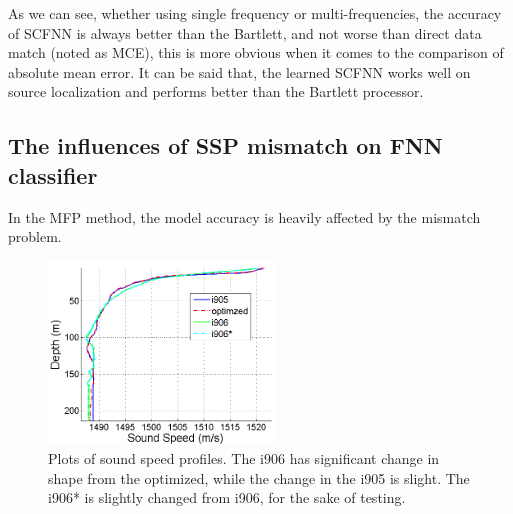 As we can see, whether using single frequency or multi-frequencies, the accuracy of SCFNN is always better than the Bartlett, and not worse than direct data match (noted as MCE), this is more obvious when it comes to the comparison of absolute mean error.
It can be said that, the learned SCFNN works well on source localization and performs better than the Bartlett processor.
\subsection{The influences of SSP mismatch on FNN classifier}
In the MFP method, the model accuracy is heavily affected by the mismatch problem\cite{tolstoy1989sensitivity,feuillade1989environmental}.%
\begin{figure}
\includegraphics[width=6cm]{figure/ssp4}
\caption{Plots of sound speed profiles. The i906 has significant change in shape from the optimized, while the change in the i905 is slight. The i906{*} is slightly changed from i906, for the sake of testing.}
\end{figure}
